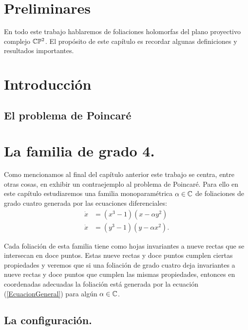 \documentclass[10pt]{book}
\theoremstyle{definition}
\begin{document}
\tableofcontents
\chapter{Preliminares}

En todo este trabajo hablaremos de foliaciones holomorfas del plano proyectivo complejo $\mathbb{C}\mathbb{P}^2$. El propósito de este capítulo es recordar algunas definiciones y resultados importantes.

     

\chapter{Introducción}

  \section{El problema de Poincaré}

    

\chapter{La familia de grado 4.}
Como mencionamos al final del capítulo anterior este trabajo se centra, entre otras cosas, en exhibir un contraejemplo al problema de Poincaré. Para ello en este capítulo estudiaremos una familia monoparamétrica $\alpha\in\mathbb{C}$ de foliaciones de grado cuatro generada por las ecuaciones diferenciales:
\begin{equation}
\label{EcuacionGeneral}
\begin{aligned}
\dot{x} &= (x^{3}-1)(x-\alpha y^{2})\\
\dot{x} &= (y^{3}-1)(y-\alpha x^{2}).
\end{aligned}
\end{equation}

Cada foliación de esta familia tiene como hojas invariantes a nueve rectas que se intersecan en doce puntos. Estas nueve rectas y doce puntos cumplen ciertas propiedades y veremos que si una foliación de grado cuatro deja invariantes a nueve rectas y doce puntos que cumplen las mismas propiedades, entonces en coordenadas adecuadas la foliación está generada por la ecuación (\ref{EcuacionGeneral}) para algún $\alpha\in\mathbb{C}$.

 
	\section{La configuración.}
\end{document}
